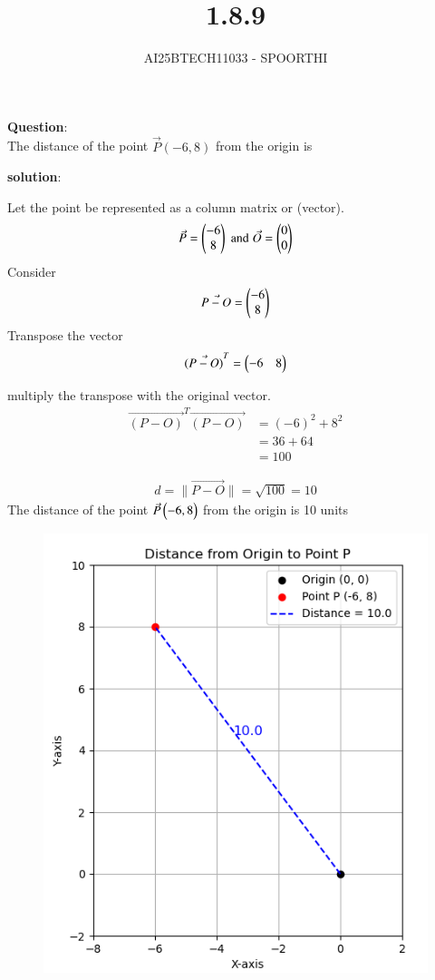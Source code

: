\documentclass[journal,12pt,onecolumn]{IEEEtran}
\begin{document}
\title{1.8.9}
\author{AI25BTECH11033 - SPOORTHI}
{\let\newpage\relax\maketitle}

	
\textbf{Question}:\\
\noindent The distance of the point \( \Vec{P}(-6, 8) \) from the origin is 

\textbf{solution}:

Let the point be represented as a column matrix or (vector).
\begin{align}
    \Vec{P}=\begin{pmatrix}-6 \\8\end{pmatrix} \;  \text{and}  \; \Vec{O}=\begin{pmatrix}0\\0\end{pmatrix}
\end{align}
Consider\\
\begin{align}
\Vec{P-O}=\begin{pmatrix}-6\\8\end{pmatrix}
\end{align}
Transpose the vector
\begin{align}
    \Vec{(P-O)}^T=\begin{pmatrix}-6 & 8\end{pmatrix} 
\end{align}

multiply the transpose with the original vector.
\begin{align}
\Vec{(P-O)}^T \Vec{(P-O)} &= (-6)^2 + 8^2 \\
    &= 36 + 64 \\
    &= 100
\end{align}

\begin{align}
d=\|\Vec{P-O}\|= \sqrt{100}=10
\end{align}
The distance of the point $\Vec{P}\begin{pmatrix}-6,8\end{pmatrix}$ from the origin is 10 units
\begin{figure}[h!]
 \centering
 \includegraphics[width=0.8\linewidth]{figs/fig1.png}
 \caption{}
 \label{fig}
 \end{figure}
\end{document}
